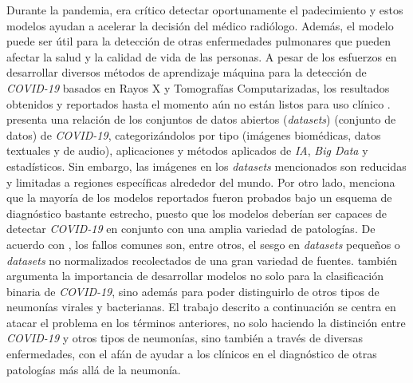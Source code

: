 Durante la pandemia, era crítico detectar oportunamente el padecimiento y estos modelos ayudan a
acelerar la decisión del médico radiólogo. Además, el modelo puede ser útil para la detección de
otras enfermedades pulmonares que pueden afectar la salud y la calidad de vida de las personas. A
pesar de los esfuerzos en desarrollar diversos métodos de aprendizaje máquina para la detección de
\textit{COVID-19} basados en Rayos X y Tomografías Computarizadas, los resultados obtenidos y
reportados hasta el momento aún no están listos para uso clínico \cite{roberts2021common}.
\citeauthor{shuja2021covid} presenta una relación de los conjuntos de datos abiertos (\textit{datasets})
(conjunto de datos) de
\textit{COVID-19}, categorizándolos por tipo (imágenes biomédicas, datos textuales y de audio), aplicaciones y
métodos aplicados de \textit{IA}, \textit{Big Data} y estadísticos. Sin embargo, las imágenes en los \textit{datasets}
mencionados son reducidas y limitadas a regiones específicas alrededor del mundo. Por otro lado,
\citeauthor{greenspan2020position} menciona que la mayoría de los modelos reportados fueron probados bajo un esquema
de diagnóstico bastante estrecho, puesto que los modelos deberían ser capaces de detectar \textit{COVID-19} en conjunto
con una amplia variedad de patologías. De acuerdo con \citeauthor{roberts2021common}, los fallos comunes son, entre
otros, el sesgo en \textit{datasets} pequeños o \textit{datasets} no normalizados recolectados de una gran variedad de
fuentes. \citeauthor{roberts2021common} también argumenta la importancia de desarrollar modelos no solo para la
clasificación binaria de \textit{COVID-19}, sino además para poder distinguirlo de otros tipos de neumonías virales y
bacterianas. El trabajo descrito a continuación se centra en atacar el problema en los términos anteriores, no solo
haciendo la distinción entre \textit{COVID-19} y otros tipos de neumonías, sino también a través de diversas
enfermedades, con el afán de ayudar a los clínicos en el diagnóstico de otras patologías más allá de la neumonía.
